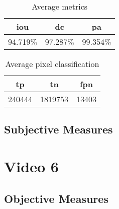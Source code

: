 \begin{minipage}[c]{0.475\textwidth}
\begin{table}[H]
    \centering
    \begin{tabular}{||c c c||} 
        \hline
        \acrshort{iou} & \acrshort{dc} & \acrshort{pa} \\ [0.5ex] 
        \hline\hline
        94.719\% & 97.287\% & 99.354\% \\ [1ex] 
        \hline
    \end{tabular}
    \caption{Average metrics}
    \label{tab:metrics_video_4}
\end{table}
\end{minipage}
\begin{minipage}[c]{0.475\textwidth}
\begin{table}[H]
    \centering
    \begin{tabular}{||c c c||} 
        \hline
        \acrshort{tp} & \acrshort{tn} & \acrshort{fpn} \\ [0.5ex] 
        \hline\hline
        240444 & 1819753 & 13403 \\ [1ex] 
        \hline
    \end{tabular}
    \caption{Average pixel classification}
    \label{tab:pixels_video_4}
\end{table}
\end{minipage}

\subsection{Subjective Measures}


\section{Video 6}
\subsection{Objective Measures}

